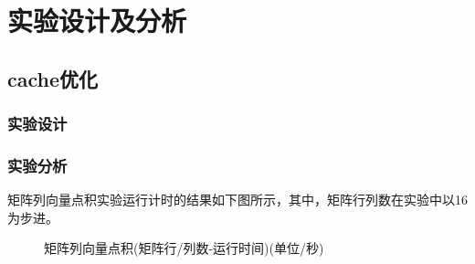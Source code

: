 \documentclass[a4paper]{article}
\begin{document}
\section{实验设计及分析}
   \subsection{cache优化}
      \subsubsection{实验设计}

      \subsubsection{实验分析}
      矩阵列向量点积实验运行计时的结果如下图所示，其中，矩阵行列数在实验中以16为步进。
      \begin{figure}[!htbp]
         \centering
         \centering
         \caption{矩阵列向量点积(矩阵行/列数-运行时间)(单位/秒)}
         \label{fig:mat_timing}
      \end{figure}
\end{document}
